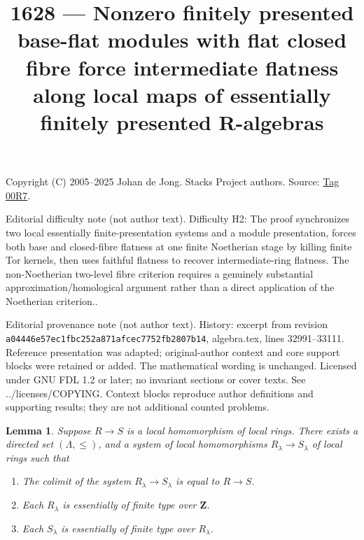 \documentclass{amsart}
\theoremstyle{plain}
\newtheorem{lemma}[subsection]{Lemma}
\theoremstyle{definition}
\theoremstyle{remark}
\numberwithin{equation}{subsection}
\begin{document}
\title[Stacks Project, Tag 00R7]{1628 --- Nonzero finitely presented base-flat modules with flat closed fibre force intermediate flatness along local maps of essentially finitely presented R-algebras}
\maketitle
\noindent Copyright (C) 2005--2025 Johan de Jong. Stacks Project authors. Source: \href{https://stacks.math.columbia.edu/tag/00R7}{Tag 00R7}.

\noindent Editorial difficulty note (not author text). Difficulty H2: The proof synchronizes two local essentially finite-presentation systems and a module presentation, forces both base and closed-fibre flatness at one finite Noetherian stage by killing finite Tor kernels, then uses faithful flatness to recover intermediate-ring flatness. The non-Noetherian two-level fibre criterion requires a genuinely substantial approximation/homological argument rather than a direct application of the Noetherian criterion..

\noindent Editorial provenance note (not author text). History: excerpt from revision \texttt{a0444\allowbreak 6e57e\allowbreak c1fbc\allowbreak 252a8\allowbreak 71afc\allowbreak ec775\allowbreak 2fb28\allowbreak 07b14}, algebra.tex, lines 32991--33111. Reference presentation was adapted; original-author context and core support blocks were retained or added. The mathematical wording is unchanged. Licensed under GNU FDL 1.2 or later; no invariant sections or cover texts. See ../licenses/COPYING. Context blocks reproduce author definitions and supporting results; they are not additional counted problems.

\begin{lemma}
\label{lemma-limit-no-condition-local}
Suppose $R \to S$ is a local homomorphism of local rings.
There exists a directed set $(\Lambda, \leq)$, and
a system of local homomorphisms $R_\lambda \to S_\lambda$
of local rings such that
\begin{enumerate}
\item The colimit of the system $R_\lambda \to S_\lambda$
is equal to $R \to S$.
\item Each $R_\lambda$ is essentially of finite type
over $\mathbf{Z}$.
\item Each $S_\lambda$ is essentially of finite type
over $R_\lambda$.
\end{enumerate}
\end{lemma}
\end{document}
